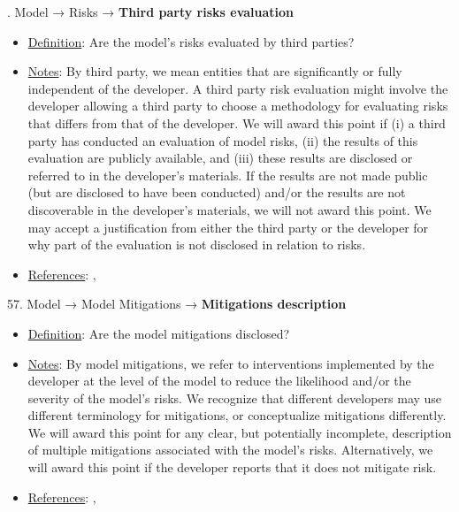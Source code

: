 . Model → Risks → \textbf{Third party risks evaluation}
\vspace{-\parskip}
\begin{itemize}
\item
\underline{Definition}: Are the model’s risks evaluated by third parties?
\item
\underline{Notes}: By third party, we mean entities that are significantly or fully independent of the developer. A third party risk evaluation might involve the developer allowing a third party to choose a methodology for evaluating risks that differs from that of the developer. We will award this point if (i) a third party has conducted an evaluation of model risks, (ii) the results of this evaluation are publicly available, and (iii) these results are disclosed or referred to in the developer’s materials. If the results are not made public (but are disclosed to have been conducted) and/or the results are not discoverable in the developer’s materials, we will not award this point. We may accept a justification from either the third party or the developer for why part of the evaluation is not disclosed in relation to risks.
\item
\underline{References}: \citet{raji2022audit}, \citet{weidinger2021ethical}
\end{itemize}


57. Model → Model Mitigations → \textbf{Mitigations description}
\vspace{-\parskip}
\begin{itemize}
\item
\underline{Definition}: Are the model mitigations disclosed?
\item
\underline{Notes}: By model mitigations, we refer to interventions implemented by the developer at the level of the model to reduce the likelihood and/or the severity of the model’s risks. We recognize that different developers may use different terminology for mitigations, or conceptualize mitigations differently. We will award this point for any clear, but potentially incomplete, description of multiple mitigations associated with the model's risks. Alternatively, we will award this point if the developer reports that it does not mitigate risk.
\item
\underline{References}: \citet{solaiman2023evaluating}, \citet{weidinger2021ethical}
\end{itemize}


